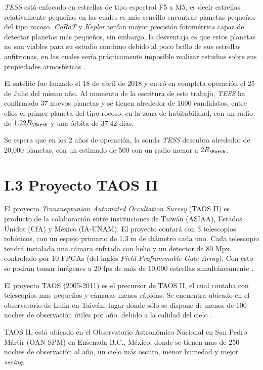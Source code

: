 \textit{TESS} está enfocado en estrellas de tipo espectral F5 a M5, es decir estrellas relativamente pequeñas en las cuales es más sencillo encontrar planetas pequeños del tipo rocoso. \textit{CoRoT} y \textit{Kepler} tenían mayor precisión fotométrica capaz de detectar planetas más pequeños, sin embargo, la desventaja es que estos planetas no son viables para su estudio continuo debido al poco brillo de sus estrellas anfitrionas, en las cuales sería prácticamente imposible realizar estudios sobre sus propiedades atmosféricas \citep{sullivan2015transiting}. 

El satélite fue lanzado el 18 de abril de 2018 y entró en completa operación el 25 de Julio del mismo año. Al momento de la escritura de este trabajo, \textit{TESS} ha confirmado 37 nuevos planetas y se tienen alrededor de 1600 candidatos, entre ellos el primer planeta del tipo rocoso, en la zona de habitabilidad, con un radio de $1.22R_{\Earth}$ y una órbita de 37.42 días. \cite{gilbert2020first}

Se espera que en los 2 años de operación, la sonda \textit{TESS} descubra alrededor de 20,000 planetas, con un estimado de 500 con un radio menor a $2R_{\Earth}$.

\section*{I.3 Proyecto TAOS II}

El proyecto \textit{Transneptunian Automated Occultation Survey} (TAOS II) es producto de la colaboración entre instituciones de Taiwán (ASIAA), Estados Unidos (CfA) y México (IA-UNAM). El proyecto contará con 3 telescopios robóticos, con un espejo primario de 1.3 m de diámetro cada uno. Cada telescopio tendrá instalada una cámara enfriada con helio y un detector de 80 Mpx controlado por 10 FPGAs (del inglés \textit{Field Proframmable Gate Array}). Con esto se podrán tomar imágenes a 20 fps de más de 10,000 estrellas simultáneamente \cite{lehner2012transneptunian}.

El proyecto TAOS (2005-2011) es el precursor de TAOS II, el cual contaba con telescopios mas pequeños y cámaras menos rápidas. Se encuentra ubicado en el observatorio de Lulin en Taiwán, lugar donde sólo se dispone de menos de 100 noches de observación útiles por año, debido a la calidad del cielo \citep{lehner2010taos}.

TAOS II, está ubicado en el Observatorio Astronómico Nacional en San Pedro Mártir (OAN-SPM) en Ensenada B.C., México, donde se tienen mas de 250 noches de observación al año, un cielo más oscuro, menor humedad y mejor \textit{seeing}.

